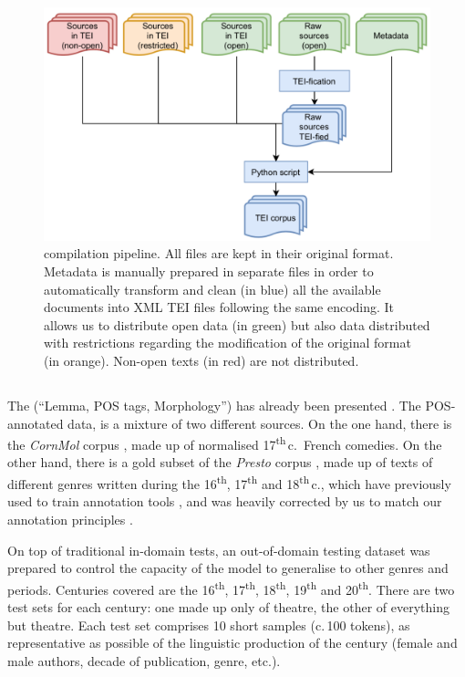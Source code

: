 \begin{figure}[htp]
    \centering
    \includegraphics[width=1\linewidth]{static/media/mod_eval/dalembert/corpus_trans.png}
    \caption{\freemmax compilation pipeline. All files are kept in their original format. Metadata is manually prepared in separate files in order to automatically transform and clean (in blue) all the available documents into XML TEI files following the same encoding. It allows us to distribute open data (in green) but also data distributed with restrictions regarding the modification of the original format (in orange). Non-open texts (in red) are not distributed.}
    \label{fig:pipeline}
\end{figure}

\subsection{\texorpdfstring{\freemlpm}{FREEM LPM}}\label{freem_lpm}

The \freemlpm (``Lemma, POS tags, Morphology'') has already been presented \cite{gabay_standardizing_2020}. The POS-annotated data, is a mixture of two different sources. On the one hand, there is the \textit{CornMol} corpus \cite{camps_corpus_2020}, made up of normalised 17\textsuperscript{th}\,c.~French comedies. On the other hand, there is a gold subset of the \textit{Presto} corpus \cite{blumenthal_presto_2017}, made up of texts of different genres written during the 16\textsuperscript{th}, 17\textsuperscript{th} and 18\textsuperscript{th}\,c., which have previously used to train annotation tools \cite{diwersy_ressources_2017}, and was heavily corrected by us to match our annotation principles \cite{gabay_manuel_2020}.

On top of traditional in-domain tests, an out-of-domain testing dataset was prepared to control the capacity of the model to generalise to other genres and periods. Centuries covered are the 16\textsuperscript{th}, 17\textsuperscript{th}, 18\textsuperscript{th}, 19\textsuperscript{th} and 20\textsuperscript{th}. There are two test sets for each century: one made up only of theatre, the other of everything but theatre. Each test set comprises 10 short samples (c.\,100 tokens), as representative as possible of the linguistic production of the century (female and male authors, decade of publication, genre, etc.).

